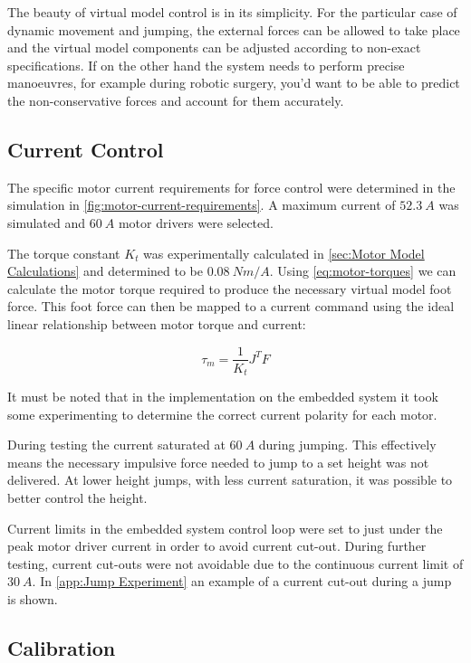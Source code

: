 The beauty of virtual model control is in its simplicity. For the particular case of dynamic movement and jumping, the external forces can be allowed to take place and the virtual model components can be adjusted according to non-exact specifications. If on the other hand the system needs to perform precise manoeuvres, for example during robotic surgery, you'd want to be able to predict the non-conservative forces and account for them accurately.

\subsection{Current Control}
\label{sec:Current Control}

The specific motor current requirements for force control were determined in the simulation in \cref{fig:motor-current-requirements}. A maximum current of $52.3\ A$ was simulated and $60\ A$ motor drivers were selected. 

The torque constant $K_t$ was experimentally calculated in \cref{sec:Motor Model Calculations} and determined to be $0.08\ Nm/A$. Using \cref{eq:motor-torques} we can calculate the motor torque required to produce the necessary virtual model foot force. This foot force can then be mapped to a current command using the ideal linear relationship between motor torque and current:

\begin{equation}
\tau_m = \frac{1}{K_t} J^TF
\end{equation}

It must be noted that in the implementation on the embedded system it took some experimenting to determine the correct current polarity for each motor. 

During testing the current saturated at $60\ A$ during jumping. This effectively means the necessary impulsive force needed to jump to a set height was not delivered. At lower height jumps, with less current saturation, it was possible to better control the height.

Current limits in the embedded system control loop were set to just under the peak motor driver current in order to avoid current cut-out. During further testing, current cut-outs were not avoidable due to the continuous current limit of $30\ A$. In \cref{app:Jump Experiment} an example of a current cut-out during a jump is shown.

\subsection{Calibration} 

